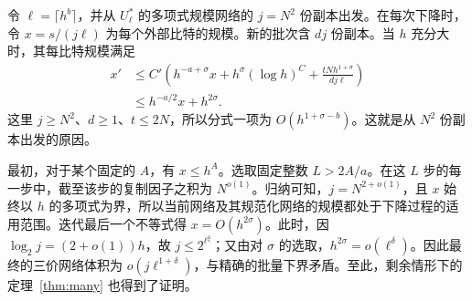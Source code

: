 令 \(\ell=\lceil h^b\rceil\)，并从 \(U_\ell^*\) 的多项式规模网络的 \(j=N^2\) 份副本出发。在每次下降时，令 \(x=s/(j\ell)\) 为每个外部比特的规模。新的批次含 \(dj\) 份副本。当 \(h\) 充分大时，其每比特规模满足
\[
 \begin{split}
 x'&\le C'\left(h^{-a+\sigma}x+
        h^\sigma(\log h)^C+\frac{tNh^{1+\sigma}}{dj\ell}\right)\\
   &\le h^{-a/2}x+h^{2\sigma}.
 \end{split}
\]
这里 \(j\ge N^2\)、\(d\ge1\)、\(t\le 2N\)，所以分式一项为 \(O(h^{1+\sigma-b})\)。这就是从 \(N^2\) 份副本出发的原因。

最初，对于某个固定的 \(A\)，有 \(x\le h^A\)。选取固定整数 \(L>2A/a\)。在这 \(L\) 步的每一步中，截至该步的复制因子之积为 \(N^{o(1)}\)。归纳可知，\(j=N^{2+o(1)}\)，且 \(x\) 始终以 \(h\) 的多项式为界，所以当前网络及其规范化网络的规模都处于下降过程的适用范围。迭代最后一个不等式得 \(x=O(h^{2\sigma})\)。此时，因 \(\log_2 j=(2+o(1))h\)，故 \(j\le 2^{\ell^\xi}\)；又由对 \(\sigma\) 的选取，\(h^{2\sigma}=o(\ell^\delta)\)。因此最终的三价网络体积为 \(o(j\ell^{1+\delta})\)，与精确的批量下界矛盾。至此，剩余情形下的定理~\ref{thm:many} 也得到了证明。
